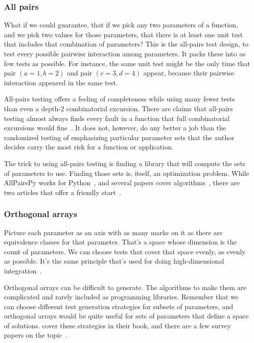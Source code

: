 \documentclass[fleqn,10pt]{olplainarticle}
\begin{document}
\subsubsection{All pairs}

What if we could guarantee, that if we pick any two parameters
of a function, and we pick two values for those parameters,
that there is at least one unit test that includes that combination
of parameters? This is the all-pairs test design, to test
every possible pairwise interaction among parameters.
It packs these into as few tests as possible. For instance,
the same unit test might be the only time that pair
$(a=1, b=2)$ and pair $(c=3, d=4)$ appear, because their
pairwise interaction appeared in the same test.

All-pairs testing offers a feeling of completeness while
using many fewer tests than even a depth-2 combinatorial
excursion. There are claims that all-pairs testing almost
always finds every fault in a function that full combinatorial
excursions would fine~\citep{Pairwise}. It does not, however,
do any better a job than the randomized testing of emphasizing
particular parameter sets that the author decides carry
the most risk for a function or application.

The trick to using all-pairs testing is finding a library
that will compute the sets of parameters to use. Finding
those sets is, itself, an optimization problem.
While AllPairsPy works for Python~\citep{allpairspy},
and several papers cover algorithms~\citep{tung2000automating,pezze2008},
there are two articles that offer a friendly start~\citep{blass2002,czerwoka2006}.


\subsubsection{Orthogonal arrays}

Picture each parameter as an axis with as many marks
on it as there are equivalence classes for that parameter.
That's a space whose dimension is the count of parameters.
We can choose tests that cover that space evenly, as evenly
as possible. It's the same principle that's used for doing
high-dimensional integration~\citep{Owen1992}.

Orthogonal arrays can
be difficult to generate. The algorithms to make them
are complicated and rarely included as programming libraries.
Remember that we can choose different test generation strategies
for subsets of parameters, and orthogonal arrays would be
quite useful for sets of parameters that define a space of
solutions.
\citet{petke2015practical} cover these strategies in their book,
and there are a few survey papers on the topic~\citep{grindal2005,nie2011survey,khalsa2014orchestrated}.
\end{document}
